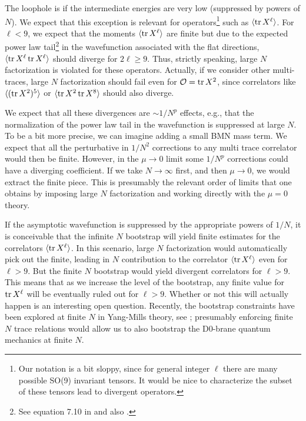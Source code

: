 \documentclass[11pt]{article}
\renewcommand{\ev}[1]{\langle #1 \rangle} %
\begin{document}
The loophole is if the intermediate energies are very low (suppressed by powers of $N$). We expect that this exception is relevant for operators\footnote{Our notation is a bit sloppy, since for general integer $\ell$ there are many possible SO(9) invariant tensors. It would be nice to characterize the subset of these tensors lead to divergent operators.} such as  $\ev{\tr X^\ell}$. For $\ell < 9 $, we expect that the moments $\ev{\tr X^\ell}$ are finite  \cite{Polchinski:1999br} but due to the expected power law tail\footnote{See equation 7.10 in \cite{Polchinski:1999br} and also \cite{Plefka:1997xq, Frohlich:1999zf, Hoppe:2000tj,  Hasler:2002wt, Lin:2014wka}. } in the wavefunction associated with the flat directions, $\ev{\tr X^\ell \tr X^\ell }$ should diverge for $2 \ell \ge 9$. Thus, strictly speaking, large $N$ factorization is violated for these operators. Actually, if we consider other multi-traces, large $N$ factorization should fail even for $\mathcal{O} = \tr X^2$, since correlators like $\ev{(\tr X^2)^5}$ or $\ev{\tr X^2 \tr X^8}$ should also diverge.


We expect that all these divergences are $\sim 1/N^{p}$ effects, e.g., that the normalization of the power law tail in the wavefunction is suppressed at large $N$. 
To be a bit more precise, we can imagine adding a small BMN mass term. We expect that all the perturbative in $1/N^2$ corrections to any multi trace correlator would then be finite. However, in the $\mu \to 0 $ limit some $1/N^{p}$ corrections could have a diverging coefficient. If we take $N \to \infty$ first, and then $\mu \to 0$, we would extract the finite piece. This is presumably the relevant order of limits that one obtains by imposing large $N$ factorization and working directly with the $\mu = 0$ theory.


If the asymptotic wavefunction is suppressed by the appropriate powers of $1/N$, it is conceivable that the infinite $N$ bootstrap will yield finite estimates for the correlators $\ev{\tr X^\ell}$. In this scenario, large $N$ factorization would automatically pick out the finite, leading in $N$ contribution to the correlator $\ev{\tr X^\ell}$ even for $\ell > 9$. But the finite $N$ bootstrap would yield divergent correlators for $\ell >9$. This means that as we increase the level of the bootstrap, any finite value for $\tr X^\ell$ will be eventually ruled out for $\ell >9$. Whether or not this will actually happen is an interesting open question. Recently, the bootstrap constraints have been explored at finite $N$ in Yang-Mills theory, see \cite{Kazakov:2024ool}; presumably enforcing finite $N$ trace relations would allow us to also bootstrap the D0-brane quantum mechanics at finite $N$.
\end{document}
